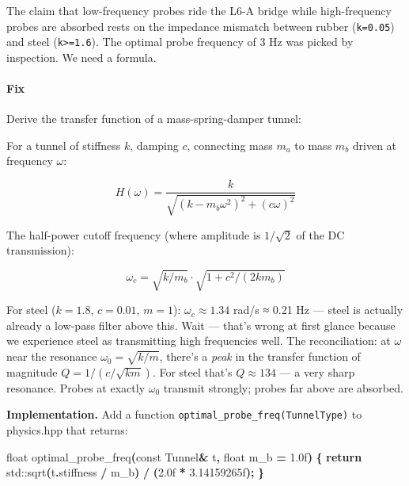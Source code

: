 \documentclass[
  11pt,
  a4paper,
]{article}
\newenvironment{Shaded}{\begin{snugshade}}{\end{snugshade}}
\newcommand{\AttributeTok}[1]{\textcolor[rgb]{0.13,0.29,0.53}{#1}}
\newcommand{\BuiltInTok}[1]{#1}
\newcommand{\ControlFlowTok}[1]{\textcolor[rgb]{0.13,0.29,0.53}{\textbf{#1}}}
\newcommand{\DataTypeTok}[1]{\textcolor[rgb]{0.13,0.29,0.53}{#1}}
\newcommand{\FloatTok}[1]{\textcolor[rgb]{0.00,0.00,0.81}{#1}}
\newcommand{\NormalTok}[1]{#1}
\newcommand{\OperatorTok}[1]{\textcolor[rgb]{0.81,0.36,0.00}{\textbf{#1}}}
\newcommand{\VariableTok}[1]{\textcolor[rgb]{0.00,0.00,0.00}{#1}}
\begin{document}
The claim that low-frequency probes ride the L6-A bridge while
high-frequency probes are absorbed rests on the impedance mismatch
between rubber (\texttt{k=0.05}) and steel
(\texttt{k\textgreater{}=1.6}). The optimal probe frequency of 3 Hz was
picked by inspection. We need a formula.

\paragraph{Fix}\label{fix-4}

Derive the transfer function of a mass-spring-damper tunnel:

For a tunnel of stiffness \(k\), damping \(c\), connecting mass \(m_a\)
to mass \(m_b\) driven at frequency \(\omega\):

\[
H(\omega) = \frac{k}{\sqrt{(k - m_b \omega^2)^2 + (c\omega)^2}}
\]

The half-power cutoff frequency (where amplitude is \(1/\sqrt{2}\) of
the DC transmission):

\[
\omega_c = \sqrt{k/m_b} \cdot \sqrt{1 + c^2/(2 k m_b)}
\]

For steel (\(k=1.8\), \(c=0.01\), \(m=1\)): \(\omega_c \approx 1.34\)
rad/s ≈ 0.21 Hz --- steel is actually already a low-pass filter above
this. Wait --- that's wrong at first glance because we experience steel
as transmitting high frequencies well. The reconciliation: at \(\omega\)
near the resonance \(\omega_0 = \sqrt{k/m}\), there's a \emph{peak} in
the transfer function of magnitude \(Q = 1/(c/\sqrt{k m})\). For steel
that's \(Q \approx 134\) --- a very sharp resonance. Probes at exactly
\(\omega_0\) transmit strongly; probes far above are absorbed.

\textbf{Implementation.} Add a function
\texttt{optimal\_probe\_freq(TunnelType)} to physics.hpp that returns:

\begin{Shaded}
\begin{Highlighting}[]
\DataTypeTok{float}\NormalTok{ optimal\_probe\_freq}\OperatorTok{(}\AttributeTok{const}\NormalTok{ Tunnel}\OperatorTok{\&}\NormalTok{ t}\OperatorTok{,} \DataTypeTok{float} \VariableTok{m\_b} \OperatorTok{=} \FloatTok{1.0}\BuiltInTok{f}\OperatorTok{)} \OperatorTok{\{}
    \ControlFlowTok{return} \BuiltInTok{std::}\NormalTok{sqrt}\OperatorTok{(}\NormalTok{t}\OperatorTok{.}\NormalTok{stiffness }\OperatorTok{/} \VariableTok{m\_b}\OperatorTok{)} \OperatorTok{/} \OperatorTok{(}\FloatTok{2.0}\BuiltInTok{f} \OperatorTok{*} \FloatTok{3.14159265}\BuiltInTok{f}\OperatorTok{);}
\OperatorTok{\}}
\end{Highlighting}
\end{Shaded}
\end{document}
